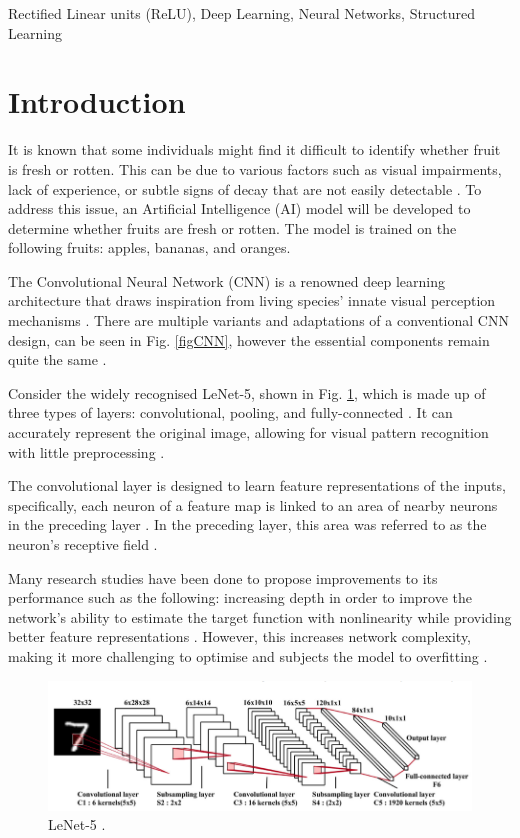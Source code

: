\documentclass[conference]{IEEEtran}
\begin{document}
\begin{IEEEkeywords}
Rectified Linear units (ReLU), Deep Learning, Neural Networks, Structured Learning
\end{IEEEkeywords}

\section{Introduction}

It is known that some individuals might find it difficult to identify whether fruit is fresh or rotten. This can be due to various factors such as visual impairments, lack of experience, or subtle signs of decay that are not easily detectable \cite{b22}. To address this issue, an Artificial Intelligence (AI) model will be developed to determine whether fruits are fresh or rotten. The model is trained on the following fruits: apples, bananas, and oranges.

The Convolutional Neural Network (CNN) is a renowned deep learning architecture that draws inspiration from living species' innate visual perception mechanisms \cite{b21}. There are multiple variants and adaptations of a conventional CNN design, can be seen in Fig. \ref{figCNN}, however the essential components remain quite the same \cite{b6}.

Consider the widely recognised LeNet-5, shown in Fig. \ref{figLeNet}, which is made up of three types of layers: convolutional, pooling, and fully-connected \cite{b6}. It can accurately represent the original image, allowing for visual pattern recognition with little preprocessing \cite{b6}.

The convolutional layer is designed to learn feature representations of the inputs, specifically, each neuron of a feature map is linked to an area of nearby neurons in the preceding layer \cite{b23}. In the preceding layer, this area was referred to as the neuron's receptive field \cite{b6}.

Many research studies have been done to propose improvements to its performance such as the following: increasing depth in order to improve the network's ability to estimate the target function with nonlinearity while providing better feature representations \cite{b6}. However, this increases network complexity, making it more challenging to optimise and subjects the model to overfitting \cite{b6}.

\begin{figure}[h]
    \centering
    \includegraphics[width=\linewidth]{LeNet-5.png}
    \caption{LeNet-5 \cite{b6}.}
    \label{figLeNet}
\end{figure}
\end{document}
